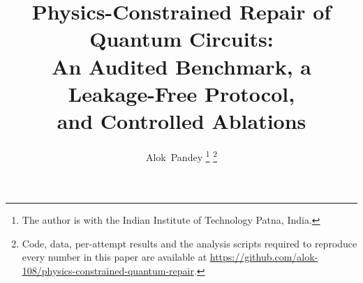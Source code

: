 \documentclass[journal]{IEEEtran}
\begin{document}
\title{Physics-Constrained Repair of Quantum Circuits:\\
An Audited Benchmark, a Leakage-Free Protocol,\\
and Controlled Ablations}

\author{Alok~Pandey%
\thanks{The author is with the Indian Institute of Technology Patna, India.}%
\thanks{Code, data, per-attempt results and the analysis scripts required to
reproduce every number in this paper are available at
\protect\url{https://github.com/alok-108/physics-constrained-quantum-repair}.}}


\maketitle
\end{document}
